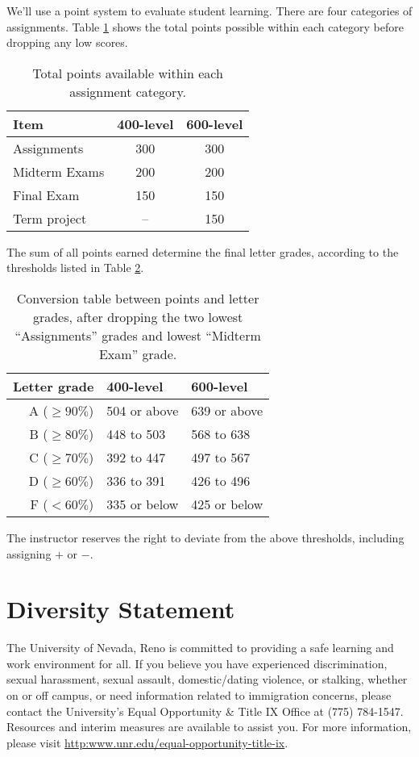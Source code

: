 \documentclass[11pt,onecolumn]{article}
\begin{document}
We'll use a point system to evaluate student learning. There are four categories of assignments. Table \ref{tab:points} shows the total points possible within each category before dropping any low scores.

\begin{table}[h]
  \begin{center}
  \begin{tabular}{l|c|c}	%
Item&400-level& 600-level\\\hline\hline
  Assignments& 300 & 300\\
  Midterm Exams& 200 & 200\\
  Final Exam& 150 & 150\\
  Term project &-- & 150 \\
  \end{tabular}
  \caption{Total points available within each assignment category. \label{tab:points}}
\end{center}

\end{table}

The sum of all points earned determine the final letter grades, according to the thresholds listed in Table \ref{tab:grade}.

\begin{table}[h]
\begin{center}
  \begin{tabular}{r|l|l}
    Letter grade &400-level& 600-level\\\hline\hline
A ($\geq 90\%$)&504 or above&639 or above\\
B ($\geq 80\%$)&448 to 503&568 to 638\\
C ($\geq 70\%$)&392 to 447&497 to 567\\
D ($\geq 60\%$)&336 to 391&426 to 496\\
F ($< 60\%$)&335 or below&425 or below
  \end{tabular}
  \caption{Conversion table between points and letter grades, after dropping the two lowest ``Assignments'' grades and lowest ``Midterm Exam'' grade.\label{tab:grade}}
\end{center}

\end{table}

The instructor reserves the right to deviate from the above thresholds, including assigning $+$ or $-$.

\section*{Diversity Statement}
The University of Nevada, Reno is committed to providing a safe learning and work environment for all. If you believe you have experienced discrimination, sexual harassment, sexual assault, domestic/dating violence, or stalking, whether on or off campus, or need information related to immigration concerns, please contact the University’s Equal Opportunity \& Title IX Office at (775) 784-1547. Resources and interim measures are available to assist you. For more information, please visit \url{http:www.unr.edu/equal-opportunity-title-ix}.
\end{document}
